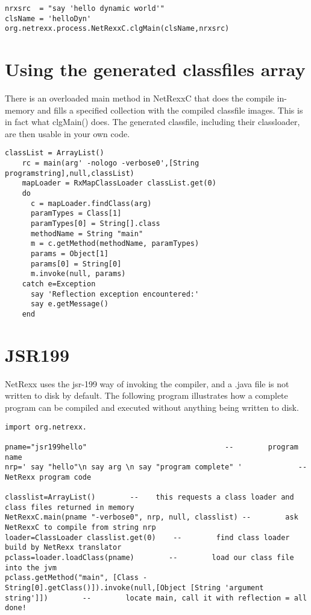 \begin{lstlisting}[label=memloadgoexample,caption=Example of compile-load-go]
nrxsrc  = "say 'hello dynamic world'"
clsName = 'helloDyn'
org.netrexx.process.NetRexxC.clgMain(clsName,nrxsrc)
\end{lstlisting}

\section{Using the generated classfiles array}
There is an overloaded main method in NetRexxC that does the compile
in-memory and fills a specified collection with the compiled classfile
images. This is in fact what clgMain() does. The generated classfile,
including their classloader, are then usable in your own code.

\begin{lstlisting}[label=memclasslistexample,caption=Example of using the classes collection]
classList = ArrayList()
    rc = main(arg' -nologo -verbose0',[String programstring],null,classList)
    mapLoader = RxMapClassLoader classList.get(0)
    do
      c = mapLoader.findClass(arg)
      paramTypes = Class[1]
      paramTypes[0] = String[].class
      methodName = String "main"
      m = c.getMethod(methodName, paramTypes)
      params = Object[1]
      params[0] = String[0]
      m.invoke(null, params)
    catch e=Exception
      say 'Reflection exception encountered:'
      say e.getMessage()
    end
\end{lstlisting}


\section{JSR199}
NetRexx uses the jsr-199 way of invoking the compiler, and a .java
file is not written to disk by default.  The following program
illustrates how a complete program can be compiled and executed
without anything being written to disk.

\begin{lstlisting}[label=jsr199,caption=JSR199 example]
import org.netrexx.

pname="jsr199hello"                                --        program name
nrp=' say "hello"\n say arg \n say "program complete" '             --        NetRexx program code

classlist=ArrayList()        --    this requests a class loader and class files returned in memory
NetRexxC.main(pname "-verbose0", nrp, null, classlist) --        ask NetRexxC to compile from string nrp
loader=ClassLoader classlist.get(0)    --        find class loader build by NetRexx translator
pclass=loader.loadClass(pname)        --        load our class file into the jvm
pclass.getMethod("main", [Class -
String[0].getClass()]).invoke(null,[Object [String 'argument
string']])        --        locate main, call it with reflection = all done!
\end{lstlisting}
